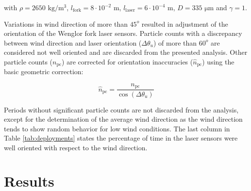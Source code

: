 \noindent with $\rho = 2650$ $\mathrm{kg/m^3}$,
$l_{\mathrm{fork}} = 8 \cdot 10^{-2}$ m,
$l_{\mathrm{laser}} = 6 \cdot 10^{-4}$ m, $D = 335$ $\mathrm{\mu m}$
and $\gamma = 1$.

Variations in wind direction of more than $45^o$ resulted in
adjustment of the orientation of the Wenglor fork laser
sensors. Particle counts with a discrepancy between wind direction and
laser orientation ($\Delta \theta_u$) of more than $60^o$ are
considered not well oriented and are discarded from the presented
analysis. Other particle counts ($n_{\mathrm{pc}}$) are corrected for
orientation inaccuracies ($\hat{n}_{\mathrm{pc}}$) using the basic
geometric correction:

\begin{equation}
  \hat{n}_{\mathrm{pc}} = \frac{n_{\mathrm{pc}}}{\cos(\Delta \theta_u)}
\end{equation}

Periods without significant particle counts are not discarded from the
analysis, except for the determination of the average wind direction
as the wind direction tends to show random behavior for low wind
conditions. The last column in Table \ref{tab:deployments} states the
percentage of time in the laser sensors were well oriented with
respect to the wind direction.

\section{Results}

